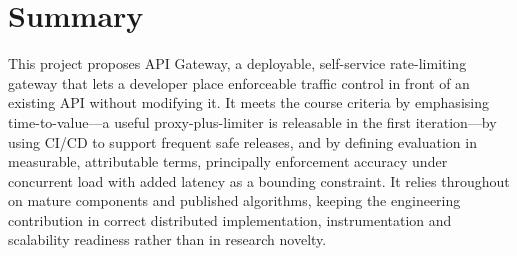 \documentclass[11pt,a4paper]{article}
\begin{document}
\section{Summary}
This project proposes API Gateway, a deployable, self-service rate-limiting
gateway that lets a developer place enforceable traffic control in front of an
existing API without modifying it. It meets the course criteria by
emphasising time-to-value---a useful proxy-plus-limiter is releasable in the
first iteration---by using CI/CD to support frequent safe releases, and by
defining evaluation in measurable, attributable terms, principally enforcement
accuracy under concurrent load with added latency as a bounding constraint.
It relies throughout on mature components and published algorithms, keeping
the engineering contribution in correct distributed implementation,
instrumentation and scalability readiness rather than in research novelty.
\end{document}
